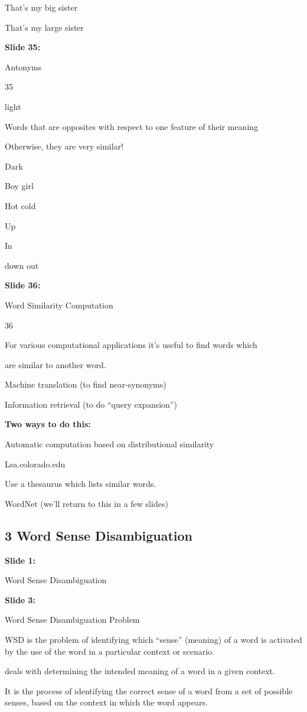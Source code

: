 \documentclass[11pt,a4paper]{article}
\begin{document}
That’s my big sister

That’s my large sister

\textbf{Slide 35:}

Antonyms

35

light

Words that are opposites with respect to one feature of their  meaning

Otherwise, they are very similar!

Dark

Boy	girl

Hot cold

Up

In

down  out

\textbf{Slide 36:}

Word Similarity Computation

36

For various computational applications it’s useful to find words which

are similar to another word.

Machine translation (to find near-synonyms)

Information retrieval (to do “query expansion”)

\textbf{Two ways to do this:} 

Automatic computation based on distributional similarity

Lsa.colorado.edu

Use a thesaurus which lists similar words.

WordNet (we’ll return to this in a few slides)


\subsection{3 Word Sense Disambiguation}

\textbf{Slide 1:}

Word Sense Disambiguation

\textbf{Slide 3:}

Word Sense Disambiguation Problem

WSD is the problem of identifying which “sense” (meaning) of a word is activated by the use of the word in a particular context or scenario.

deals with determining the intended meaning of a word in a given context.

It is the process of identifying the correct sense of a word from a set of possible senses, based on the context in which the word appears.
\end{document}
